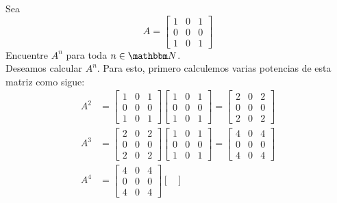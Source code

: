 \begin{example}
    Sea
    $$A = \begin{bmatrix}
        1 & 0 & 1 \\
        0 & 0 & 0 \\
        1 & 0 & 1
    \end{bmatrix}$$
    Encuentre $A^n$ para toda $n \in \NN$. \\
    \solucion Deseamos calcular $A^n$. Para esto, primero calculemos varias potencias de esta matriz como sigue:
    \begin{align*}
        A^2 & = \begin{bmatrix}
            1 & 0 & 1 \\
            0 & 0 & 0 \\
            1 & 0 & 1
        \end{bmatrix} \begin{bmatrix}
            1 & 0 & 1 \\
            0 & 0 & 0 \\
            1 & 0 & 1
        \end{bmatrix} = \begin{bmatrix}
            2 & 0 & 2 \\
            0 & 0 & 0 \\
            2 & 0 & 2
        \end{bmatrix} \\
        A^3 & = \begin{bmatrix}
            2 & 0 & 2 \\
            0 & 0 & 0 \\
            2 & 0 & 2
        \end{bmatrix} \begin{bmatrix}
            1 & 0 & 1 \\
            0 & 0 & 0 \\
            1 & 0 & 1
        \end{bmatrix} = \begin{bmatrix}
            4 & 0 & 4 \\
            0 & 0 & 0 \\
            4 & 0 & 4
        \end{bmatrix} \\
        A^4 & = \begin{bmatrix}
            4 & 0 & 4 \\
            0 & 0 & 0 \\
            4 & 0 & 4
        \end{bmatrix} \begin{bmatrix}

\end{bmatrix}
\end{align*}
\end{example}
